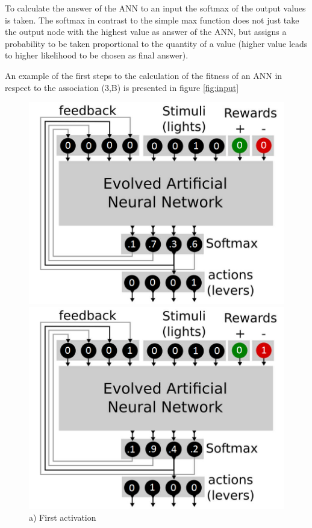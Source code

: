 \documentclass[12pt,twoside]{article}
\theoremstyle{plain}
\theoremstyle{definition}
\theoremstyle{remark}
\begin{document}
To calculate the answer of the ANN to an input the softmax of the output values is taken. The softmax in contrast to the simple max function does not just take the output node with the highest value as answer of the ANN, but assigns a probability to be taken proportional to the quantity of a value (higher value leads to higher likelihood to be chosen as final answer).\medskip

An example of the first steps to the calculation of the fitness of an ANN in respect to the association (3,B) is presented in figure \ref{fig:input}

\begin{figure}[!tbp]
	\centering
	\begin{minipage}[b]{0.4\textwidth}
		\includegraphics[width=\textwidth]{network_structure_input1.png}
		\captionsetup{labelformat=empty}
		\caption*{a) First activation}
	\end{minipage}
	\hfill
	\begin{minipage}[b]{0.4\textwidth}
		\includegraphics[width=\textwidth]{network_structure_input2.png}

\end{minipage}
\end{figure}
\end{document}
